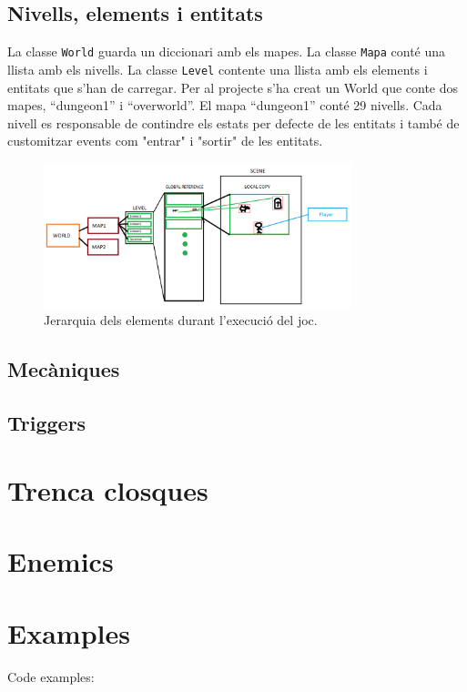 \documentclass[a4paper,12pt]{article}
\begin{document}
\subsection{Nivells, elements i entitats}
La classe \texttt{World} guarda un diccionari amb els mapes. La classe \texttt{Mapa} conté una llista amb els nivells. La classe \texttt{Level} contente una llista amb els elements i entitats que s'han de carregar. Per al projecte s'ha creat un World que conte dos mapes, ``dungeon1'' i ``overworld''. El mapa ``dungeon1'' conté 29 nivells. Cada nivell es responsable de contindre els estats per defecte de les entitats i també de customitzar events com "entrar" i "sortir" de les entitats. 


\begin{figure}[ht!]
    \centering
    \includegraphics[width=0.8\textwidth]{../imgs/global_to_local.png} %
    \caption{Jerarquia dels elements durant l'execució del joc.}
    \label{fig:global_to_local}
\end{figure}

\subsection{Mecàniques}
\subsection{Triggers}

\section{Trenca closques}

\section{Enemics}



\section{Examples}
Code examples:
\end{document}
